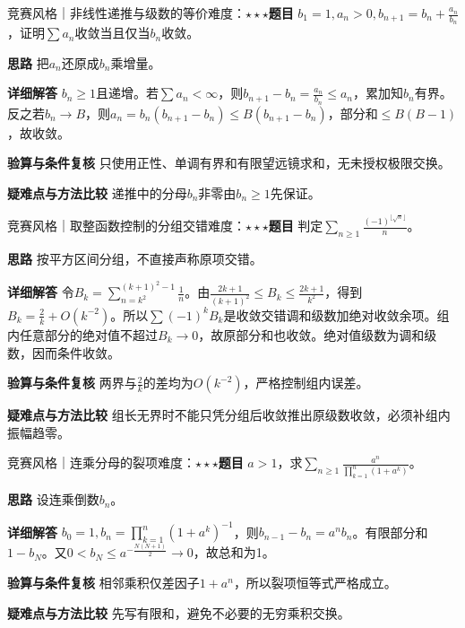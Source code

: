 \begin{example}{竞赛风格｜非线性递推与级数的等价}{难度：$\star\star\star$}\label{ic:ex:delta_series:recursivesum}\textbf{题目} $b_1=1,a_n>0,b_{n+1}=b_n+\frac{a_n}{b_n}$，证明$\sum a_n$收敛当且仅当$b_n$收敛。\par \textbf{思路} 把$a_n$还原成$b_n$乘增量。\par \textbf{详细解答} $b_n\ge1$且递增。若$\sum a_n<\infty$，则$b_{n+1}-b_n=\frac{a_n}{b_n}\le a_n$，累加知$b_n$有界。反之若$b_n\to B$，则$a_n=b_n(b_{n+1}-b_n)\le B(b_{n+1}-b_n)$，部分和$\le B(B-1)$，故收敛。\par \textbf{验算与条件复核} 只使用正性、单调有界和有限望远镜求和，无未授权极限交换。\par \textbf{疑难点与方法比较} 递推中的分母$b_n$非零由$b_n\ge1$先保证。\end{example}

\begin{example}{竞赛风格｜取整函数控制的分组交错}{难度：$\star\star\star$}\label{ic:ex:delta_series:floorsign}\textbf{题目} 判定$\sum_{n\ge1}\frac{(-1)^{\lfloor\sqrt n\rfloor}}{n}$。\par \textbf{思路} 按平方区间分组，不直接声称原项交错。\par \textbf{详细解答} 令$B_k=\sum_{n=k^2}^{(k+1)^2-1}\frac{1}{n}$。由$\frac{2k+1}{(k+1)^2}\le B_k\le\frac{2k+1}{k^2}$，得到$B_k=\frac{2}{k}+O(k^{-2})$。所以$\sum(-1)^kB_k$是收敛交错调和级数加绝对收敛余项。组内任意部分的绝对值不超过$B_k\to0$，故原部分和也收敛。绝对值级数为调和级数，因而条件收敛。\par \textbf{验算与条件复核} 两界与$\frac{2}{k}$的差均为$O(k^{-2})$，严格控制组内误差。\par \textbf{疑难点与方法比较} 组长无界时不能只凭分组后收敛推出原级数收敛，必须补组内振幅趋零。\end{example}

\begin{example}{竞赛风格｜连乘分母的裂项}{难度：$\star\star\star$}\label{ic:ex:delta_series:productsum}\textbf{题目} $a>1$，求$\sum_{n\ge1}\frac{a^n}{\prod_{k=1}^n(1+a^k)}$。\par \textbf{思路} 设连乘倒数$b_n$。\par \textbf{详细解答} $b_0=1,b_n=\prod_{k=1}^n(1+a^k)^{-1}$，则$b_{n-1}-b_n=a^nb_n$。有限部分和$1-b_N$。又$0<b_N\le a^{-\frac{N(N+1)}{2}}\to0$，故总和为1。\par \textbf{验算与条件复核} 相邻乘积仅差因子$1+a^n$，所以裂项恒等式严格成立。\par \textbf{疑难点与方法比较} 先写有限和，避免不必要的无穷乘积交换。\end{example}

